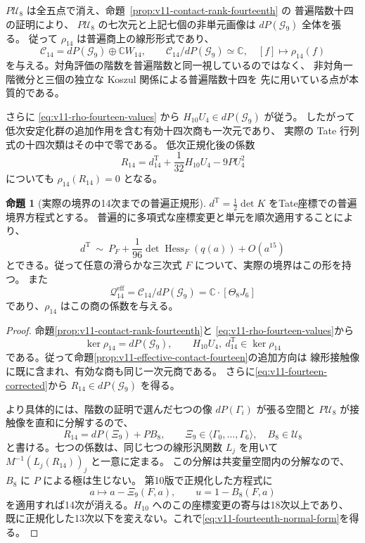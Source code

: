\documentclass[a4paper,11pt]{ltjsarticle}
\theoremstyle{definition}
\newtheorem{theorem}{命題}[section]
\begin{document}
\(P\mathcal U_8\) は全五点で消え、命題~\ref{prop:v11-contact-rank-fourteenth} の
普遍階数十四の証明により、
\(P\mathcal U_8\) の七次元と上記七個の非単元画像は \(dP(\mathcal G_9)\) 全体を張る。
従って \(\rho_{14}\) は普遍商上の線形形式であり、
\[
 \mathcal C_{14}=dP(\mathcal G_9)\oplus\mathbb C W_{14},\qquad
 \mathcal C_{14}/dP(\mathcal G_9)\simeq\mathbb C,
 \quad [f]\longmapsto\rho_{14}(f)
\]
を与える。対角評価の階数を普遍階数と同一視しているのではなく、
非対角一階微分と三個の独立な Koszul 関係による普遍階数十四を
先に用いている点が本質的である。

さらに \eqref{eq:v11-rho-fourteen-values} から
\(H_{10}U_4\in dP(\mathcal G_9)\) が従う。
したがって低次安定化群の追加作用を含む有効十四次商も一次元であり、
実際の Tate 行列式の十四次類はその中で零である。
低次正規化後の係数
\[
 R_{14}=d^{\mathrm T}_{14}+\frac1{32}H_{10}U_4-9PU_4^2
\]
についても \(\rho_{14}(R_{14})=0\) となる。

\begin{theorem}[実際の境界の14次までの普遍正規形]
\label{thm:v11-fourteenth-normal-form}
$d^{\mathrm T}=\frac12\det K$ をTate座標での普遍境界方程式とする。
普遍的に多項式な座標変更と単元を順次適用することにより、
\begin{equation}\label{eq:v11-fourteenth-normal-form}
 d^{\mathrm T}\ \sim\
 P_F+\frac1{96}\det\operatorname{Hess}_F(q(a))+O(a^{15})
\end{equation}
とできる。従って任意の滑らかな三次式 $F$ について、実際の境界はこの形を持つ。
また
\[
 \mathcal Q^{\mathrm{eff}}_{14}
   =\mathcal C_{14}/dP(\mathcal G_9)
   =\mathbb C\cdot[\Theta_8J_6]
\]
であり、$\rho_{14}$ はこの商の係数を与える。
\end{theorem}
\begin{proof}
命題\ref{prop:v11-contact-rank-fourteenth}と
\eqref{eq:v11-rho-fourteen-values}から
\[
 \ker\rho_{14}=dP(\mathcal G_9),\qquad
 H_{10}U_4,\ d^{\mathrm T}_{14}\in\ker\rho_{14}
\]
である。従って命題\ref{prop:v11-effective-contact-fourteen}の追加方向は
線形接触像に既に含まれ、有効な商も同じ一次元商である。
さらに\eqref{eq:v11-fourteen-corrected}から $R_{14}\in dP(\mathcal G_9)$ を得る。

より具体的には、階数の証明で選んだ七つの像 $dP(\Gamma_i)$ が張る空間と
$P\mathcal U_8$ が接触像を直和に分解するので、
\[
 R_{14}=dP(\Xi_9)+P B_8,\qquad
 \Xi_9\in\langle\Gamma_0,\ldots,\Gamma_6\rangle,\quad B_8\in\mathcal U_8
\]
と書ける。七つの係数は、同じ七つの線形汎関数 $L_j$ を用いて
$M^{-1}(L_j(R_{14}))_j$ と一意に定まる。
この分解は共変量空間内の分解なので、$B_8$ に $P$ による極は生じない。
第10版で正規化した方程式に
\[
 a\longmapsto a-\Xi_9(F,a),\qquad
 u=1-B_8(F,a)
\]
を適用すれば14次が消える。$H_{10}$ へのこの座標変更の寄与は18次以上であり、
既に正規化した13次以下を変えない。これで\eqref{eq:v11-fourteenth-normal-form}を得る。
\end{proof}
\end{document}

